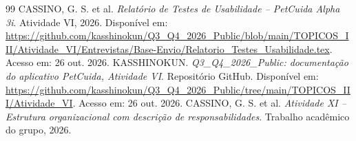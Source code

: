 \documentclass[12pt,a4paper]{article}
\begin{document}
\begin{thebibliography}{99}
 CASSINO, G. S. et al. \textit{Relatório de Testes de Usabilidade -- PetCuida Alpha 3i}. Atividade VI, 2026. Disponível em: \url{https://github.com/kasshinokun/Q3_Q4_2026_Public/blob/main/TOPICOS_III/Atividade_VI/Entrevistas/Base-Envio/Relatorio_Testes_Usabilidade.tex}. Acesso em: 26 out. 2026.
 KASSHINOKUN. \textit{Q3\_Q4\_2026\_Public: documentação do aplicativo PetCuida, Atividade VI}. Repositório GitHub. Disponível em: \url{https://github.com/kasshinokun/Q3_Q4_2026_Public/tree/main/TOPICOS_III/Atividade_VI}. Acesso em: 26 out. 2026.
 CASSINO, G. S. et al. \textit{Atividade XI -- Estrutura organizacional com descrição de responsabilidades}. Trabalho acadêmico do grupo, 2026.
\end{thebibliography}
\end{document}
